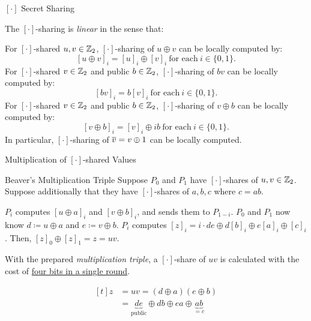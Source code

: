 \documentclass[../240906_cryptlab_flute.tex]{subfiles}
\begin{document}
\begin{frame}{\([\cdot]\) Secret Sharing}
    \begin{exampleblock}{}
        \small
        The \([\cdot]\)-sharing is \emph{linear} in the sense that:
        \begin{enumerate}
            \ii
            For \([\cdot]\)-shared \(u, v \in \mathbb{Z}_2\),
            \([\cdot]\)-sharing of \(u \oplus v\) can be locally computed by:
            \[
                [u \oplus v]_i = [u]_i \oplus [v]_i~\text{for each}~i \in \{0,1\}.
            \]
            \ii
            For \([\cdot]\)-shared \(v \in \mathbb{Z}_2\) and public \(b \in \mathbb{Z}_2\),
            \([\cdot]\)-sharing of \(bv\) can be locally computed by:
            \[
                [bv]_i = b[v]_i~\text{for each}~i \in \{0,1\}.
            \]
            \ii
            For \([\cdot]\)-shared \(v \in \mathbb{Z}_2\) and public \(b \in \mathbb{Z}_2\),
            \([\cdot]\)-sharing of \(v \oplus b\) can be locally computed by:
            \[
                [v \oplus b]_i = [v]_i \oplus ib~\text{for each}~i \in \{0,1\}.
            \]
            In particular, \([\cdot]\)-sharing of \(\overline{v} = v \oplus 1\) can be locally computed.
        \end{enumerate}
    \end{exampleblock}
\end{frame}

\begin{frame}{Multiplication of \([\cdot]\)-shared Values}
    \begin{block}{Beaver's Multiplication Triple}
        Suppose \(P_0\) and \(P_1\) have \([\cdot]\)-shares of \(u, v \in \mathbb{Z}_2\).
        Suppose additionally that they have \([\cdot]\)-shares of \(a, b, c\) where \(c = ab\).
        \begin{enumerate}
            \ii
            \(P_i\) computes \([u \oplus a]_i\) and \([v \oplus b]_i\),
            and sends them to \(P_{1-i}\).
            \ii
            \(P_0\) and \(P_1\) now know \(d \coloneqq u \oplus a\) and \(e \coloneqq v \oplus b\).
            \ii
            \(P_i\) computes \([z]_i = i \cdot de \oplus d[b]_i \oplus e[a]_i \oplus [c]_i\).
            \ii
            Then, \([z]_0 \oplus [z]_1 = z = uv\).
        \end{enumerate}
        With the prepared \emph{multiplication triple},
        a \([\cdot]\)-share of \(uv\) is calculated with the cost of \ul{four bits in a single round}.
    \end{block}

    \begin{exampleblock}{}
        \[\begin{aligned}[t]
            z &= uv = (d \oplus a)(e \oplus b) \\
              &= {\underbrace{de}_\text{public}} \oplus db \oplus ea \oplus \underbrace{ab}_{=c}
        \end{aligned}\]
    \end{exampleblock}
\end{frame}
\end{document}
